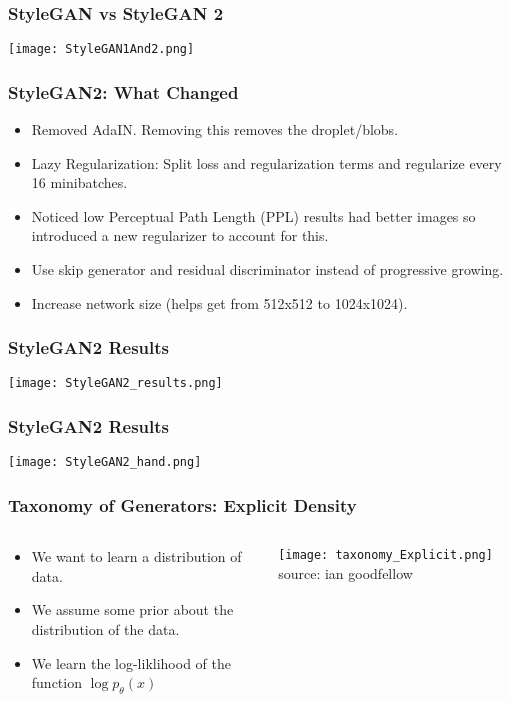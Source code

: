 \begin{frame}
    \frametitle{StyleGAN vs StyleGAN 2}
    \center\texttt{[image: StyleGAN1And2.png]}
\end{frame}

\begin{frame}
    \frametitle{StyleGAN2: What Changed}
    \begin{itemize}
        \item Removed AdaIN. Removing this removes the droplet/blobs.
        \item Lazy Regularization: Split loss and regularization terms and
            regularize every 16 minibatches.
        \item Noticed low Perceptual Path Length (PPL) results had better images
            so introduced a new regularizer to account for this.
        \item Use skip generator and residual discriminator instead of
            progressive growing.
        \item Increase network size (helps get from 512x512 to 1024x1024).
    \end{itemize}
\end{frame}

\begin{frame}
    \frametitle{StyleGAN2 Results}
    \center\texttt{[image: StyleGAN2\_results.png]}
\end{frame}

\begin{frame}
    \frametitle{StyleGAN2 Results}
    \center\texttt{[image: StyleGAN2\_hand.png]}
\end{frame}

\begin{frame}
    \frametitle{Taxonomy of Generators: Explicit Density}
    \begin{columns}
        \begin{column}{0.48\paperwidth}
            \begin{itemize}
                \item We want to learn a distribution of
                    data. 
                \item We assume some prior about the distribution of the data. 
                \item We learn the log-liklihood of the function $\log
                    p_\theta(x)$
            \end{itemize}
        \end{column}
        \begin{column}{0.48\paperwidth}
            \texttt{[image: taxonomy\_Explicit.png]}
            \null\hfill \tiny{source: ian goodfellow}
        \end{column}
    \end{columns}
\end{frame}

